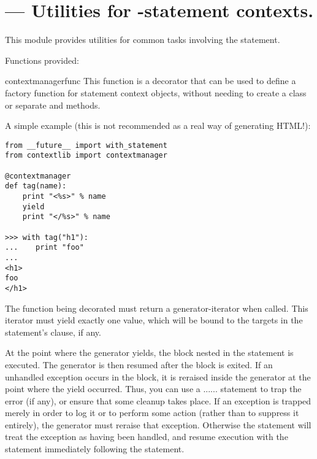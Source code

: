\section{ ---
         Utilities for -statement contexts.}



This module provides utilities for common tasks involving the
 statement.

Functions provided:

\begin{funcdesc}{contextmanager}{func}
This function is a decorator that can be used to define a factory
function for  statement context objects, without
needing to create a class or separate  and
 methods.

A simple example (this is not recommended as a real way of
generating HTML!):

\begin{verbatim}
from __future__ import with_statement
from contextlib import contextmanager

@contextmanager
def tag(name):
    print "<%s>" % name
    yield
    print "</%s>" % name

>>> with tag("h1"):
...    print "foo"
...
<h1>
foo
</h1>
\end{verbatim}

The function being decorated must return a generator-iterator when
called. This iterator must yield exactly one value, which will be
bound to the targets in the  statement's 
clause, if any.

At the point where the generator yields, the block nested in the
 statement is executed.  The generator is then resumed
after the block is exited.  If an unhandled exception occurs in the
block, it is reraised inside the generator at the point where the yield
occurred.  Thus, you can use a
...... statement to trap
the error (if any), or ensure that some cleanup takes place. If an
exception is trapped merely in order to log it or to perform some
action (rather than to suppress it entirely), the generator must
reraise that exception. Otherwise the  statement will
treat the exception as having been handled, and resume execution with
the statement immediately following the  statement.
\end{funcdesc}

